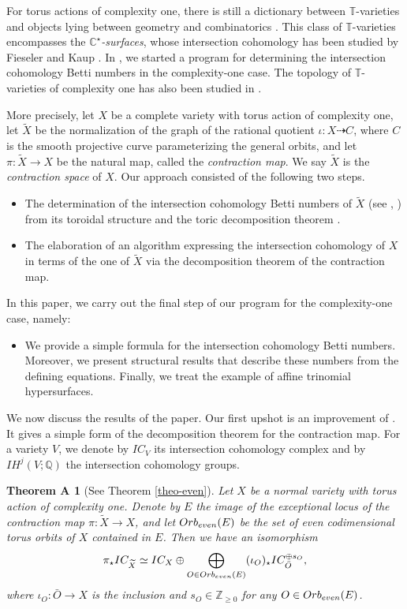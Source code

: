 \documentclass[11pt, reqno]{amsart}
\theoremstyle{plain}
\newtheorem*{thmA}{Theorem A}
\theoremstyle{definition}
\theoremstyle{remark}
\begin{document}
For torus actions of complexity one, there is still a dictionary between $\mathbb{T}$-varieties and objects lying between geometry and combinatorics \cite{AIPSV12}. This class of $\mathbb{T}$-varieties 
encompasses the \emph{$\mathbb{C}^{\star}$-surfaces},  whose intersection cohomology has been studied by Fieseler and Kaup \cite{FK86, FK91}. 
 In \cite{AL18, AL21}, we started a program for determining  the intersection cohomology Betti numbers in the complexity-one case. The topology of $\mathbb{T}$-varieties of complexity
one has also been studied in \cite{LLM20}.

More precisely, let $X$ be a complete variety with torus action of complexity one, let  $\widetilde{X}$ be the normalization of the graph of the rational quotient $\iota:  X\dashrightarrow C$, where $C$ is the smooth projective curve parameterizing the general orbits, and let $\pi: \widetilde{X}\rightarrow X$ be the natural map, called the \emph{contraction map}. We say $\widetilde{X}$ is the \emph{contraction space} of $X$. Our approach consisted of the following two steps. 
\begin{itemize}
\item[$(1)$]   The determination of the intersection cohomology Betti numbers of $\widetilde{X}$ (see \cite{AL18}, \cite[Section 5.1]{AL21}) from its toroidal structure and the toric decomposition theorem \cite{CMM18}. 
\item[$(2)$] The elaboration of an algorithm \cite{AL21} expressing the intersection cohomology 
of $X$ in terms of the one of $\widetilde{X}$ via the decomposition theorem of the contraction map.
\end{itemize}
In this paper, we carry out the final step of our program for the complexity-one case, namely:
\begin{itemize}
\item[$(3)$] We provide a simple formula for the intersection cohomology Betti numbers. Moreover,  we present structural results that describe these numbers from the defining equations. Finally, we treat the example of affine trinomial hypersurfaces. 
\end{itemize}
We now discuss the results of the paper. Our first upshot is an improvement of \cite[Theorem 1.1]{AL21}. It gives a simple form of the decomposition theorem for the contraction map. For a variety $V$, we denote by $IC_{V}$ its intersection cohomology complex and by $IH^{j}(V; \mathbb{Q})$ the intersection cohomology groups.
\begin{thmA}[See Theorem \ref{theo-even}]\label{TheoA-TheoA}
Let $X$ be a normal variety with torus action of complexity one. Denote by $E$ the image of the exceptional
locus of the contraction map $\pi: \widetilde{X}\rightarrow X$, and let $\rm{Orb}_{\rm even}(E)$ be the set of even codimensional torus orbits  of $X$ contained in $E$. Then we have an isomorphism
$$\pi_{\star} IC_{\widetilde{X}} \simeq IC_{X}\oplus \bigoplus_{O \in \rm{Orb}_{\rm even}(E)} (\iota_{O})_{\star} IC_{\bar{O}}^{\oplus s_{O}},$$
where $\iota_{O} : \bar{O}\rightarrow X$ is the inclusion and $s_{O}\in \mathbb{Z}_{\geq 0}$ for any $O\in \rm{Orb}_{\rm even}(E)$.
\end{thmA}
\end{document}
